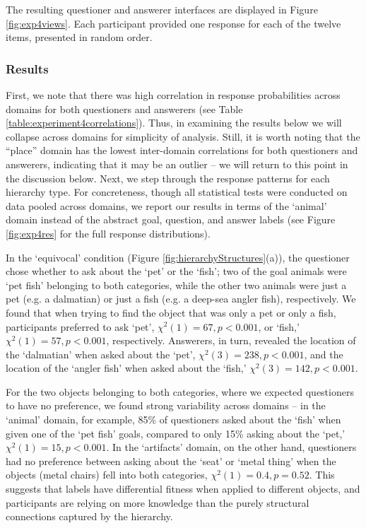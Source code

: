 \documentclass[12pt, floatsintext, man]{apa6}
\begin{document}
The resulting questioner and answerer interfaces are displayed in Figure \ref{fig:exp4views}.  Each participant provided one response for each of the twelve items, presented in random order. 

\subsubsection{Results}

First, we note that there was high correlation in response probabilities across domains for both questioners and answerers (see Table \ref{table:experiment4correlations}). Thus, in examining the results below we will collapse across domains for simplicity of analysis. Still, it is worth noting that the ``place'' domain has the lowest inter-domain correlations for both questioners and answerers, indicating that it may be an outlier -- we will return to this point in the discussion below.  Next, we step through the response patterns for each hierarchy type. For concreteness, though all statistical tests were conducted on data pooled across domains, we report our results in terms of the `animal' domain instead of the abstract goal, question, and answer labels (see Figure \ref{fig:exp4res} for the full response distributions).

In the `equivocal' condition (Figure \ref{fig:hierarchyStructures}(a)), the questioner chose whether to ask about the `pet' or the `fish'; two of the goal animals were `pet fish' belonging to both categories, while the other two animals were just a pet (e.g. a dalmatian) or just a fish (e.g. a deep-sea angler fish), respectively. We found that when trying to find the object that was only a pet or only a fish, participants preferred to ask `pet', $\chi^2(1) = 67, p < 0.001$, or `fish,' $\chi^2(1) = 57, p < 0.001$, respectively. Answerers, in turn, revealed the location of the `dalmatian' when asked about the `pet', $\chi^2(3) = 238, p < 0.001$, and the location of the `angler fish' when asked about the `fish,' $\chi^2(3) = 142, p < 0.001$. 

For the two objects belonging to both categories, where we expected questioners to have no preference, we found strong variability across domains -- in the `animal' domain, for example, 85\% of questioners asked about the `fish' when given one of the `pet fish' goals, compared to only 15\% asking about the `pet,' $\chi^2(1) = 15, p < 0.001$. In the `artifacts' domain, on the other hand, questioners had no preference between asking about the `seat' or `metal thing' when the objects (metal chairs) fell into both categories, $\chi^2(1) = 0.4, p = 0.52$. This suggests that labels have differential fitness when applied to different objects, and participants are relying on more knowledge than the purely structural connections captured by the hierarchy. 
\end{document}
